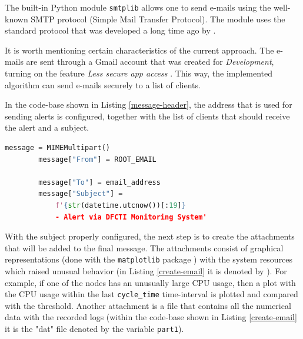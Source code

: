 \documentclass[conference]{IEEEtran}
\begin{document}
The built-in Python module \texttt{smtplib} \cite{smtplib} allows one to send e-mails using the well-known SMTP protocol (Simple Mail Transfer Protocol). The module uses the standard protocol that was developed a long time ago by \cite{postel1982rfc0821}.
\par It is worth mentioning certain characteristics of the current approach. The e-mails are sent through a Gmail account that was created for \emph{Development}, turning on the feature \emph{Less secure app access} \cite{less-secure}. This way, the implemented algorithm can send e-mails securely to a list of clients.
\par In the code-base shown in Listing \ref{message-header}, the address that is used for sending alerts is configured, together with the list of clients that should receive the alert and a subject.

\begin{lstlisting}[language=Python, caption={Setting up the e-mail headers, such as the destination and subject.},basicstyle=\footnotesize,label={message-header}]
 message = MIMEMultipart()
        message["From"] = ROOT_EMAIL
        
        message["To"] = email_address
        message["Subject"] = 
            f'{str(datetime.utcnow())[:19]}
            - Alert via DFCTI Monitoring System'
\end{lstlisting}

With the subject properly configured, the next step is to create the attachments that will be added to the final message. The attachments consist of graphical representations (done with the \texttt{matplotlib} package \cite{hunter2007matplotlib}) with the system resources which raised unusual behavior (in Listing \ref{create-email} it is denoted by ). For example, if one of the nodes has an unusually large CPU usage, then a plot with the CPU usage within the last \texttt{cycle\_time} time-interval is plotted and compared with the threshold. Another attachment is a file that contains all the numerical data with the recorded logs (within the code-base shown in Listing \ref{create-email} it is the "dat" file denoted by the variable \texttt{part1}).
\end{document}
